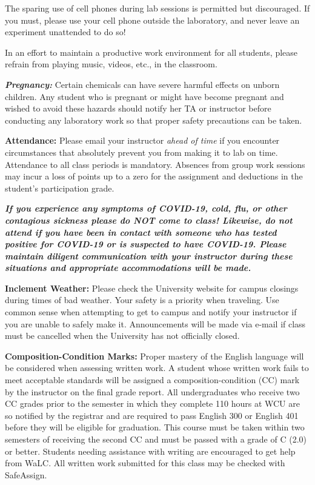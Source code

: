 \documentclass[]{tufte-book}
\begin{document}
The sparing use of cell phones during lab sessions is permitted but discouraged. If you must, please use your cell phone outside the laboratory, and never leave an experiment unattended to do so!

In an effort to maintain a productive work environment for all students, please refrain from playing music, videos, etc., in the classroom.

\textbf{\emph{Pregnancy:}} Certain chemicals can have severe harmful effects on unborn children. Any student who is pregnant or might have become pregnant and wished to avoid these hazards should notify her TA or instructor before conducting any laboratory work so that proper safety precautions can be taken.

\textbf{Attendance:} Please email your instructor \emph{ahead of time} if you encounter circumstances that absolutely prevent you from making it to lab on time. Attendance to all class periods is mandatory. Absences from group work sessions may incur a loss of points up to a zero for the assignment and deductions in the student's participation grade.

\textbf{\emph{If you experience any symptoms of COVID-19, cold, flu, or other contagious sickness please do NOT come to class! Likewise, do not attend if you have been in contact with someone who has tested positive for COVID-19 or is suspected to have COVID-19. Please maintain diligent communication with your instructor during these situations and appropriate accommodations will be made.}}

\textbf{Inclement Weather:} Please check the University website for campus closings during times of bad weather. Your safety is a priority when traveling. Use common sense when attempting to get to campus and notify your instructor if you are unable to safely make it. Announcements will be made via e-mail if class must be cancelled when the University has not officially closed.

\textbf{Composition-Condition Marks:} Proper mastery of the English language will be considered when assessing written work. A student whose written work fails to meet acceptable standards will be assigned a composition-condition (CC) mark by the instructor on the final grade report. All undergraduates who receive two CC grades prior to the semester in which they complete 110 hours at WCU are so notified by the registrar and are required to pass English 300 or English 401 before they will be eligible for graduation. This course must be taken within two semesters of receiving the second CC and must be passed with a grade of C (2.0) or better. Students needing assistance with writing are encouraged to get help from WaLC. All written work submitted for this class may be checked with SafeAssign.
\end{document}
